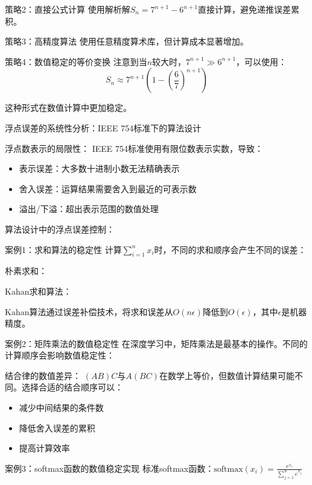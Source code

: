 策略2：直接公式计算
使用解析解$S_n = 7^{n+1} - 6^{n+1}$直接计算，避免递推误差累积。

策略3：高精度算法
使用任意精度算术库，但计算成本显著增加。

策略4：数值稳定的等价变换
注意到当$n$较大时，$7^{n+1} \gg 6^{n+1}$，可以使用：
$$S_n \approx 7^{n+1} \left(1 - \left(\frac{6}{7}\right)^{n+1}\right)$$

这种形式在数值计算中更加稳定。

浮点误差的系统性分析：IEEE 754标准下的算法设计

浮点数表示的局限性：
IEEE 754标准使用有限位数表示实数，导致：

\begin{itemize}
\item 表示误差：大多数十进制小数无法精确表示
\item 舍入误差：运算结果需要舍入到最近的可表示数
\item 溢出/下溢：超出表示范围的数值处理
\end{itemize}

算法设计中的浮点误差控制：

案例1：求和算法的稳定性
计算$\sum_{i=1}^n x_i$时，不同的求和顺序会产生不同的误差：

朴素求和：

Kahan求和算法：

Kahan算法通过误差补偿技术，将求和误差从$O(n\epsilon)$降低到$O(\epsilon)$，其中$\epsilon$是机器精度。

案例2：矩阵乘法的数值稳定性
在深度学习中，矩阵乘法是最基本的操作。不同的计算顺序会影响数值稳定性：

结合律的数值差异：
$(AB)C$与$A(BC)$在数学上等价，但数值计算结果可能不同。选择合适的结合顺序可以：
\begin{itemize}
\item 减少中间结果的条件数
\item 降低舍入误差的累积
\item 提高计算效率
\end{itemize}

案例3：softmax函数的数值稳定实现
标准softmax函数：$\text{softmax}(x_i) = \frac{e^{x_i}}{\sum_{j=1}^n e^{x_j}}$

